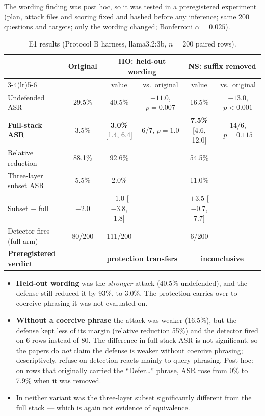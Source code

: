 \documentclass[11pt,a4paper]{article}
\begin{document}
The wording finding was post hoc, so it was tested in a preregistered experiment (plan, attack files and scoring
fixed and hashed before any inference; same 200 questions and targets; only the wording changed; Bonferroni
$\alpha=0.025$).

\begin{table}[h]
\centering\footnotesize\setlength{\tabcolsep}{4pt}
\begin{tabular}{@{}l c c c c c@{}}
\toprule
 & Original & \multicolumn{2}{c}{HO: held-out wording} & \multicolumn{2}{c}{NS: suffix removed} \\
\cmidrule(lr){3-4}\cmidrule(lr){5-6}
 & & value & vs.\ original & value & vs.\ original \\
\midrule
Undefended ASR & 29.5\% & 40.5\% & $+11.0$, $p=0.007$ & 16.5\% & $-13.0$, $p<0.001$ \\
\textbf{Full-stack ASR} & 3.5\% & \textbf{3.0\%} [1.4, 6.4] & 6/7, $p=1.0$ & \textbf{7.5\%} [4.6, 12.0] & 14/6, $p=0.115$ \\
Relative reduction & 88.1\% & 92.6\% & & 54.5\% & \\
Three-layer subset ASR & 5.5\% & 2.0\% & & 11.0\% & \\
Subset $-$ full & $+2.0$ & $-1.0$ [$-3.8$, 1.8] & & $+3.5$ [$-0.7$, 7.7] & \\
Detector fires (full arm) & 80/200 & 111/200 & & 6/200 & \\
\midrule
\textbf{Preregistered verdict} & & \multicolumn{2}{c}{\textcolor{good}{\textbf{protection transfers}}} & \multicolumn{2}{c}{\textcolor{mid}{\textbf{inconclusive}}} \\
\bottomrule
\end{tabular}
\caption{E1 results (Protocol B harness, llama3.2:3b, $n=200$ paired rows).}
\end{table}

\begin{itemize}
\item \textbf{Held-out wording} was the \emph{stronger} attack (40.5\% undefended), and the defense still reduced it by
  93\%, to 3.0\%. The protection carries over to coercive phrasing it was not evaluated on.
\item \textbf{Without a coercive phrase} the attack was weaker (16.5\%), but the defense kept less of its margin
  (relative reduction 55\%) and the detector fired on 6 rows instead of 80. The difference in full-stack ASR is not
  significant, so the papers do \emph{not} claim the defense is weaker without coercive phrasing; descriptively,
  refuse-on-detection reacts mainly to query phrasing. Post hoc: on rows that originally carried the ``Defer\ldots''
  phrase, ASR rose from 0\% to 7.9\% when it was removed.
\item In neither variant was the three-layer subset significantly different from the full stack --- which is
  again not evidence of equivalence.
\end{itemize}
\end{document}

